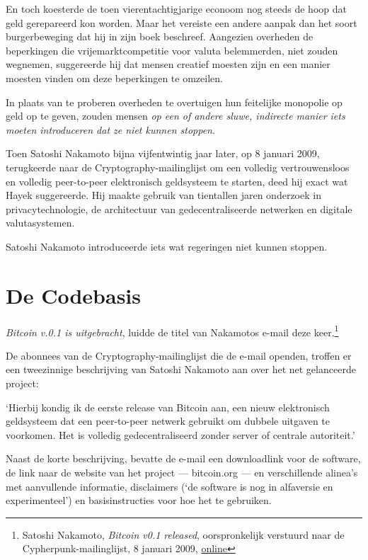 \documentclass[
  a5paper,
  smalldemyvopaper,11pt,twoside,onecolumn,openright,extrafontsizes,
hidelinks]{memoir}
\renewenvironment{quote}%
               {\list{}{\rightmargin=.3cm\leftmargin=.3cm}%
                \itshape \item[]}%
               {\endlist}
\begin{document}
En toch koesterde de toen vierentachtigjarige econoom nog steeds de hoop
dat geld gerepareerd kon worden. Maar het vereiste een andere aanpak dan
het soort burgerbeweging dat hij in zijn boek beschreef. Aangezien
overheden de beperkingen die vrijemarktcompetitie voor valuta
belemmerden, niet zouden wegnemen, suggereerde hij dat mensen creatief
moesten zijn en een manier moesten vinden om deze beperkingen te
omzeilen.

In plaats van te proberen overheden te overtuigen hun feitelijke
monopolie op geld op te geven, zouden mensen \emph{op een of andere
sluwe, indirecte manier iets moeten introduceren dat ze niet kunnen
stoppen}.

Toen Satoshi Nakamoto bijna vijfentwintig jaar later, op 8 januari 2009,
terugkeerde naar de Cryptography-mailinglijst om een volledig
vertrouwensloos en volledig peer-to-peer elektronisch geldsysteem te
starten, deed hij exact wat Hayek suggereerde. Hij maakte gebruik van
tientallen jaren onderzoek in privacytechnologie, de architectuur van
gedecentraliseerde netwerken en digitale valutasystemen.

Satoshi Nakamoto introduceerde iets wat regeringen niet kunnen stoppen.

\section{De Codebasis}\label{de-codebasis}

\emph{Bitcoin v.0.1 is uitgebracht}, luidde de titel van Nakamotos
e-mail deze keer.\footnote{Satoshi Nakamoto, \emph{Bitcoin v0.1
  released}, oorspronkelijk verstuurd naar de Cypherpunk-mailinglijst, 8
  januari 2009,
  \href{https://www.mail-archive.com/cryptography@metzdowd.com/msg10142.html}{online}}

De abonnees van de Cryptography-mailinglijst die de e-mail openden,
troffen er een tweezinnige beschrijving van Satoshi Nakamoto aan over
het net gelanceerde project:

\begin{quote}
`Hierbij kondig ik de eerste release van Bitcoin aan, een nieuw
elektronisch geldsysteem dat een peer-to-peer netwerk gebruikt om
dubbele uitgaven te voorkomen. Het is volledig gedecentraliseerd zonder
server of centrale autoriteit.'
\end{quote}

Naast de korte beschrijving, bevatte de e-mail een downloadlink voor de
software, de link naar de website van het project --- bitcoin.org --- en
verschillende alinea's met aanvullende informatie, disclaimers (`de
software is nog in alfaversie en experimenteel') en basisinstructies
voor hoe het te gebruiken.
\end{document}
